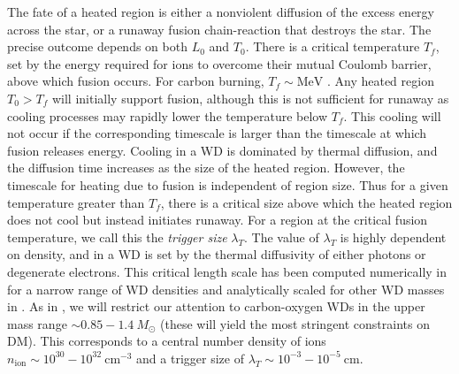 \documentclass[twocolumn, preprintnumbers,amsmath,amssymb,prd, superscriptaddress]{revtex4}
\newcommand{\MeV}{\text{MeV}}
\newcommand{\cm}{\text{cm}}
\begin{document}
The fate of a heated region is either a nonviolent diffusion of the excess energy across the star, or a runaway fusion chain-reaction that destroys the star.
The precise outcome depends on both $L_0$ and $T_0$.
There is a critical temperature $T_f$, set by the energy required for ions to overcome their mutual Coulomb barrier, above which fusion occurs.
For carbon burning, $T_f \sim \MeV$ \cite{Gasques:2005ar}.
Any heated region $T_0 > T_f$ will initially support fusion, although this is not sufficient for runaway as cooling processes may rapidly lower the temperature below $T_f$.
This cooling will not occur if the corresponding timescale is larger than the timescale at which fusion releases energy.
Cooling in a WD is dominated by thermal diffusion, and the diffusion time increases as the size of the heated region.
However, the timescale for heating due to fusion is independent of region size.
Thus for a given temperature greater than $T_f$, there is a critical size above which the heated region does not cool but instead initiates runaway.
For a region at the critical fusion temperature, we call this the \emph{trigger size} $\lambda_T$.
The value of $\lambda_T$ is highly dependent on density, and in a WD is set by the thermal diffusivity of either photons or degenerate electrons.
This critical length scale has been computed numerically in \cite{Woosley} for a narrow range of WD densities and analytically scaled for other WD masses in \cite{Graham:2015apa}.
As in \cite{Graham:2015apa}, we will restrict our attention to carbon-oxygen WDs in the upper mass range $\sim 0.85 - 1.4 ~M_{\odot}$ (these will yield the most stringent constraints on DM).
This corresponds to a central number density of ions $n_\text{ion} \sim 10^{30} - 10^{32} ~\cm^{-3}$ and a trigger size of $\lambda_T \sim 10^{-3} - 10^{-5} ~\text{cm}$.
\end{document}

